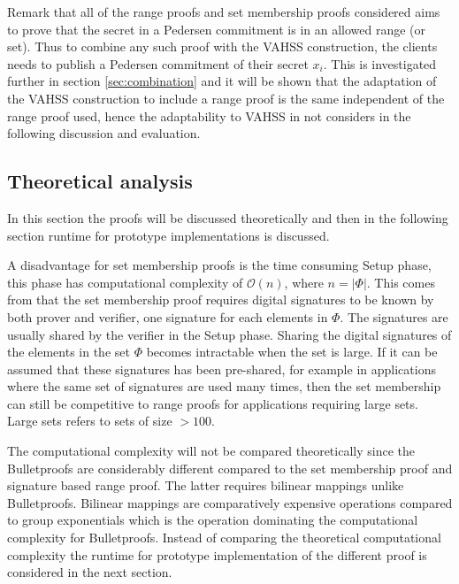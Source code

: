 Remark that all of the range proofs and set membership proofs considered aims to prove that the secret in a Pedersen commitment is in an allowed range (or set). Thus to combine any such proof with the VAHSS construction, the clients needs to publish a Pedersen commitment of their secret $x_i$. This is investigated further in section \ref{sec:combination} and it will be shown that the adaptation of the VAHSS construction to include a range proof is the same independent of the range proof used, hence the adaptability to VAHSS in not considers in the  following discussion and evaluation.



\subsection{Theoretical analysis}
In this section the proofs will be discussed theoretically and then in the following section runtime for prototype implementations is  discussed.

A disadvantage for set membership proofs is the time consuming Setup phase, this phase has computational complexity of $\mathcal{O}(n)$, where $n=|\Phi|$. This comes from that the set membership proof requires digital signatures to be known by both prover and verifier, one signature for each elements in $\Phi$. The signatures are usually shared by the verifier in the Setup phase. Sharing the digital signatures of the elements in the set $\Phi$ becomes intractable when the set is large.  If it can be assumed that these signatures has been pre-shared, for example in applications where the same set of signatures are used many times, then the set membership can still be competitive to range proofs for applications requiring large sets. Large sets refers to sets of size $>100$. 

The computational complexity will not be compared  theoretically since the Bulletproofs are considerably different compared to the set membership proof and signature based range proof. The latter requires bilinear mappings unlike Bulletproofs. Bilinear mappings are comparatively expensive operations compared to group exponentials which is the operation dominating the computational complexity for Bulletproofs. Instead of comparing the theoretical computational complexity the runtime for prototype implementation of the different proof is considered in the next section. 

